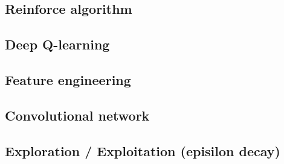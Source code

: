 \subsection{Reinforce algorithm}

\subsection{Deep Q-learning}

\subsection{Feature engineering}

\subsection{Convolutional network}

\subsection{Exploration / Exploitation (episilon decay)}

